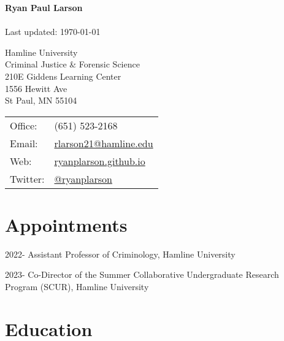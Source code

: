\documentclass[letterpaper]{article}
\def\name{Ryan Paul Larson}
\renewenvironment{itemize}{
  \begin{list}{}{
    \setlength{\leftmargin}{1.5em}
  }
}{
  \end{list}
}
\begin{document}
\textbf{{\huge \name}}\\
\\
Last updated: \today

\vspace{5ex}





\begin{minipage}{0.45\linewidth}
  Hamline University \\
  Criminal Justice \& Forensic Science \\
  210E Giddens Learning Center \\
 1556 Hewitt Ave \\
 St Paul, MN 55104
\end{minipage}
\begin{minipage}{0.45\linewidth}
  \begin{tabular}{ll}
    Office: & (651) 523-2168 \\
    Email: & \href{mailto:rlarson21@hamline.edu}{rlarson21@hamline.edu} \\
    Web: & \href{https://ryanplarson.github.io/personal_site/}{ryanplarson.github.io} \\
   Twitter: &  \href{https://twitter.com/ryanplarson}{@ryanplarson} \\
  \end{tabular}
\end{minipage}



\section*{\textbf{Appointments}}


\begin{itemize}

\item 2022-    Assistant Professor of Criminology, Hamline University

\item 2023-   Co-Director of the Summer Collaborative Undergraduate Research Program (SCUR), Hamline University


\end{itemize}



\section*{\textbf{Education}}
\end{document}
